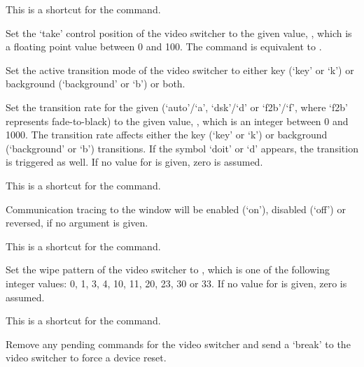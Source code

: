   This is a shortcut for the  command.

  Set the `take' control position of the video switcher to the given value, ,
  which is a floating point value between 0 and 100.
  The command is equivalent to .

  Set the active transition mode of the video switcher to either key (`key' or `k') or background
  (`background' or `b') or both.

  Set the transition rate for the given  (`auto'/`a', `dsk'/`d' or `f2b'/`f',
  where `f2b' represents fade-to-black) to the given value, ,
  which is an integer between 0 and 1000.
  The transition rate affects either the key (`key' or `k') or background (`background' or `b')
  transitions.
  If the symbol `doit' or `d' appears, the transition is triggered as well.
  If no value for  is given, zero is assumed.

  This is a shortcut for the  command.

  Communication tracing to the \MaxName{} window will be enabled (`on'), disabled (`off') or reversed,
  if no argument is given.

  This is a shortcut for the  command.

  Set the wipe pattern of the video switcher to , which is one of the following
  integer values: 0, 1, 3, 4, 10, 11, 20, 23, 30 or 33.
  If no value for  is given, zero is assumed.

  This is a shortcut for the  command.

  Remove any pending commands for the video switcher and send a `break' to the video switcher to
  force a device reset.
  
